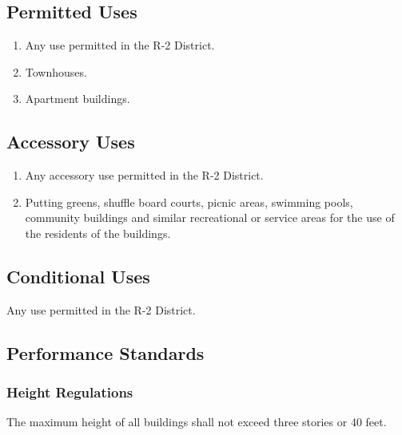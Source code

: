\subsection{Permitted Uses}
\begin{enumerate}[{\indent}1)]
    \item Any use permitted in the R-2 District.
    \item Townhouses.
    \item Apartment buildings.
\end{enumerate}
\subsection{Accessory Uses}
\begin{enumerate}[{\indent}1)]
    \item Any accessory use permitted in the R-2 District.
    \item Putting greens, shuffle board courts, picnic areas, swimming pools, community buildings and similar recreational or service areas for the use of the residents of the buildings.
\end{enumerate}
\subsection{Conditional Uses}
Any use permitted in the R-2 District.
\subsection{Performance Standards}
\subsubsection{Height Regulations}
The maximum height of all buildings shall not exceed three stories or 40 feet.
